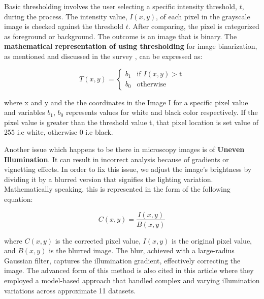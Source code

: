 \documentclass[%
	a4paper, %
	12pt, %
	english, %
	bibtotoc %
]{scrartcl}
\begin{document}
Basic thresholding involves the user selecting a specific intensity threshold, $t$, during the process. The intensity value, $I(x, y)$, of each pixel in the grayscale image is checked against the threshold $t$. After comparing, the pixel is categorized as foreground or background. The outcome is an image that is binary. The \textbf{mathematical representation of using thresholding} for image binarization, as mentioned and discussed in the survey \cite{sahoo_survey_thresholding_techniques}, can be expressed as:

\begin{equation}
T(x, y) = 
\begin{cases} 
b_1 & \text{if } I(x, y) > \text{t} \\
b_0 & \text{otherwise}
\end{cases}
\label{eq:thresholding}
\end{equation}

where x and y and the the coordinates in the Image I for a specific pixel value and variables \(b_1\), \(b_0\)  represents values for white and black color respectively. If the pixel value is greater than the 
threshold value t, that pixel location is set value of 255 i.e white, otherwise 0 i.e black.

Another issue which happens to be there in microscopy images is of \textbf{Uneven Illumination}. It can result in incorrect analysis because of gradients or vignetting effects. In order to fix this issue, we adjust the image's brightness by dividing it by a blurred version that signifies the lighting variation. Mathematically speaking, this is represented in the form of the following equation:

\begin{equation}
C(x, y) = \frac{I(x, y)}{B(x, y)}
\label{eq:illuminationcorrection}
\end{equation}

where \( C(x, y) \) is the corrected pixel value, \( I(x, y) \) is the original pixel value, and \( B(x, y) \) is the blurred image. The blur, achieved with a large-radius Gaussian filter, captures the illumination gradient, effectively correcting the image. The advanced form of this method is also cited in this article \cite{smith_illumination_correction_method} where they employed a model-based approach that handled complex and varying illumination variations across approximate 11 datasets. 
\end{document}
